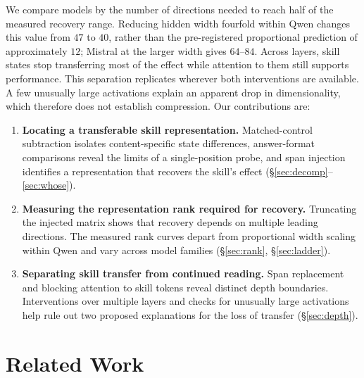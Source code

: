 \documentclass{article}
\begin{document}
We compare models by the number of directions needed to reach half of the
measured recovery range. Reducing hidden width fourfold within Qwen changes
this value from $47$ to $40$, rather than the pre-registered proportional
prediction of approximately $12$; Mistral at the larger width gives $64$--$84$.
Across layers, skill states stop transferring most of the effect while
attention to them still supports performance. This separation replicates
wherever both interventions are available. A few unusually large activations
explain an apparent drop in dimensionality, which therefore does not establish
compression. Our contributions are:
\begin{enumerate}\itemsep0pt\parskip0pt
\item \textbf{Locating a transferable skill representation.} Matched-control
subtraction isolates content-specific state differences, answer-format
comparisons reveal the limits of a single-position probe, and span injection
identifies a representation that recovers the skill's effect
(\S\ref{sec:decomp}--\ref{sec:whose}).
\item \textbf{Measuring the representation rank required for recovery.}
Truncating the injected matrix shows that recovery depends on multiple leading
directions. The measured rank curves depart from proportional width scaling
within Qwen and vary across model families (\S\ref{sec:rank}, \S\ref{sec:ladder}).
\item \textbf{Separating skill transfer from continued reading.} Span
replacement and blocking attention to skill tokens reveal distinct depth
boundaries. Interventions over multiple layers and checks for unusually large
activations help rule out two proposed explanations for the loss of transfer
(\S\ref{sec:depth}).
\end{enumerate}

\section{Related Work}
\label{sec:related}
\end{document}
